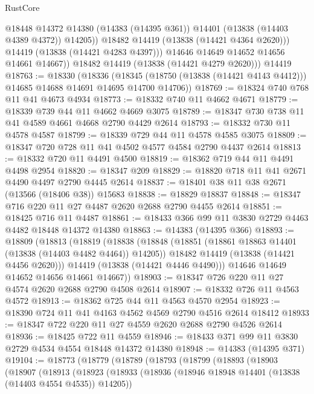 \begin{lexlean}{RustCore}
\begin{coremodule}
                  @18448
                  @14372
                  @14380
                  (@14383 (@14395 @361))
                  @14401
                  (@13838 (@14403 @4389 @4372))
                  @14205))
              @18482
              @14419
              (@13838 (@14421 @4364 @2620)))
            @14419
            (@13838 (@14421 @4283 @4397)))
          @14646
          @14649
          @14652
          @14656
          @14661
          @14667))
      @18482
      @14419
      (@13838 (@14421 @4279 @2620)))
    @14419
@18763 := @18330
    (@18336
      (@18345 (@18750 (@13838 (@14421 @4143 @4412))) @14685 @14688 @14691 @14695 @14700 @14706))
@18769 := @18324 @740 @768 @11 @41 @4673 @4934
@18773 := @18332 @740 @11 @4662 @4671
@18779 := @18339 @739 @44 @11 @4662 @4669 @3075
@18789 := @18347 @730 @738 @11 @41 @4589 @4661 @4668 @2790 @4429 @2614
@18793 := @18332 @730 @11 @4578 @4587
@18799 := @18339 @729 @44 @11 @4578 @4585 @3075
@18809 := @18347 @720 @728 @11 @41 @4502 @4577 @4584 @2790 @4437 @2614
@18813 := @18332 @720 @11 @4491 @4500
@18819 := @18362 @719 @44 @11 @4491 @4498 @2954
@18820 := @18347 @209
@18829 := @18820 @718 @11 @41 @2671 @4490 @4497 @2790 @4445 @2614
@18837 := @18401 @38 @11 @38 @2671 (@13566 (@18406 @38)) @15683
@18838 := @18829 @18837
@18848 := @18347 @716 @220 @11 @27 @4487 @2620 @2688 @2790 @4455 @2614
@18851 := @18425 @716 @11 @4487
@18861 := @18433 @366 @99 @11 @3830 @2729 @4463 @4482 @18448 @14372 @14380
@18863 := @14383 (@14395 @366)
@18893 := @18809
    (@18813
      (@18819
        (@18838
          (@18848
            (@18851 (@18861 @18863 @14401 (@13838 (@14403 @4482 @4464)) @14205))
            @18482
            @14419
            (@13838 (@14421 @4456 @2620)))
          @14419
          (@13838 (@14421 @4446 @4490)))
        @14646
        @14649
        @14652
        @14656
        @14661
        @14667))
@18903 := @18347 @726 @220 @11 @27 @4574 @2620 @2688 @2790 @4508 @2614
@18907 := @18332 @726 @11 @4563 @4572
@18913 := @18362 @725 @44 @11 @4563 @4570 @2954
@18923 := @18390 @724 @11 @41 @4163 @4562 @4569 @2790 @4516 @2614 @18412
@18933 := @18347 @722 @220 @11 @27 @4559 @2620 @2688 @2790 @4526 @2614
@18936 := @18425 @722 @11 @4559
@18946 := @18433 @371 @99 @11 @3830 @2729 @4534 @4554 @18448 @14372 @14380
@18948 := @14383 (@14395 @371)
@19104 := @18773
    (@18779
      (@18789
        (@18793
          (@18799
            (@18893
              (@18903
                (@18907
                  (@18913
                    (@18923
                      (@18933
                        (@18936 (@18946 @18948 @14401 (@13838 (@14403 @4554 @4535)) @14205))

\end{coremodule}
\end{lexlean}
